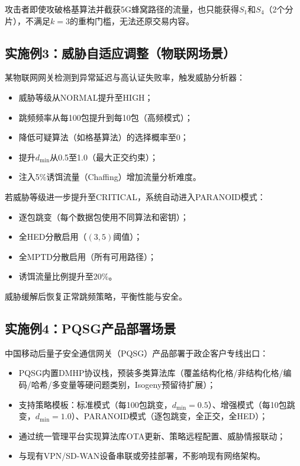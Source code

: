 ﻿\documentclass[12pt,a4paper]{article}
\begin{document}
攻击者即使攻破格基算法并截获5G蜂窝路径的流量，也只能获得$S_1$和$S_4$（2个分片），不满足$k=3$的重构门槛，无法还原交易内容。

\subsection{实施例3：威胁自适应调整（物联网场景）}

某物联网网关检测到异常延迟与高认证失败率，触发威胁分析器：

\begin{itemize}
    \item 威胁等级从NORMAL提升至HIGH；
    \item 跳频频率从每100包提升到每10包（高频模式）；
    \item 降低可疑算法（如格基算法）的选择概率至0；
    \item 提升$d_{\min}$从0.5至1.0（最大正交约束）；
    \item 注入5\%诱饵流量（Chaffing）增加流量分析难度。
\end{itemize}

若威胁等级进一步提升至CRITICAL，系统自动进入PARANOID模式：
\begin{itemize}
    \item 逐包跳变（每个数据包使用不同算法和密钥）；
    \item 全HED分散启用（$(3,5)$阈值）；
    \item 全MPTD分散启用（所有可用路径）；
    \item 诱饵流量比例提升至20\%。
\end{itemize}

威胁缓解后恢复正常跳频策略，平衡性能与安全。

\subsection{实施例4：PQSG产品部署场景}

中国移动后量子安全通信网关（PQSG）产品部署于政企客户专线出口：

\begin{itemize}
    \item PQSG内置DMHP协议栈，预装多类算法库（覆盖结构化格/非结构化格/编码/哈希/多变量等硬问题类别，Isogeny预留待扩展）；
    \item 支持策略模板：标准模式（每100包跳变，$d_{\min}=0.5$）、增强模式（每10包跳变，$d_{\min}=1.0$）、PARANOID模式（逐包跳变，全正交，全HED）；
    \item 通过统一管理平台实现算法库OTA更新、策略远程配置、威胁情报联动；
    \item 与现有VPN/SD-WAN设备串联或旁挂部署，不影响现有网络架构。
\end{itemize}
\end{document}
